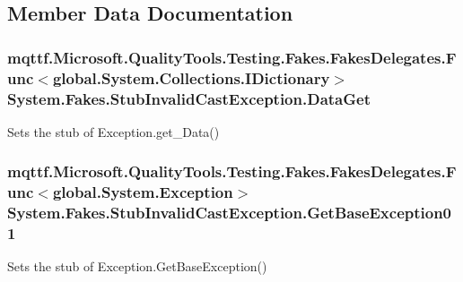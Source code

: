 \subsection{Member Data Documentation}
\hypertarget{class_system_1_1_fakes_1_1_stub_invalid_cast_exception_a6ab37f5e7d97b70fed4d5801e5a02b7e}{
\subsubsection[{Data\-Get}]{\setlength{\rightskip}{0pt plus 5cm}mqttf.\-Microsoft.\-Quality\-Tools.\-Testing.\-Fakes.\-Fakes\-Delegates.\-Func$<$global.\-System.\-Collections.\-I\-Dictionary$>$ System.\-Fakes.\-Stub\-Invalid\-Cast\-Exception.\-Data\-Get}}\label{class_system_1_1_fakes_1_1_stub_invalid_cast_exception_a6ab37f5e7d97b70fed4d5801e5a02b7e}


Sets the stub of Exception.\-get\-\_\-\-Data()

\hypertarget{class_system_1_1_fakes_1_1_stub_invalid_cast_exception_ae4b0cb4d9c229a5806ba30901a7b1699}{
\subsubsection[{Get\-Base\-Exception01}]{\setlength{\rightskip}{0pt plus 5cm}mqttf.\-Microsoft.\-Quality\-Tools.\-Testing.\-Fakes.\-Fakes\-Delegates.\-Func$<$global.\-System.\-Exception$>$ System.\-Fakes.\-Stub\-Invalid\-Cast\-Exception.\-Get\-Base\-Exception01}}\label{class_system_1_1_fakes_1_1_stub_invalid_cast_exception_ae4b0cb4d9c229a5806ba30901a7b1699}


Sets the stub of Exception.\-Get\-Base\-Exception()

